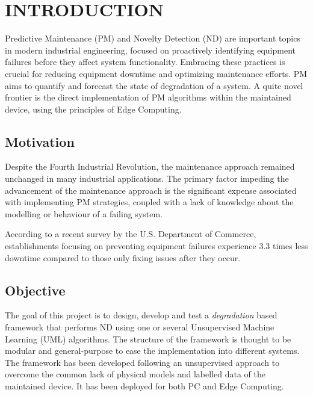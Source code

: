 \section{INTRODUCTION}
\label{sec:introduction}

Predictive Maintenance (PM) and Novelty Detection (ND) are important topics in modern industrial engineering, focused on proactively identifying equipment failures before they affect system functionality. Embracing these practices is crucial for reducing equipment downtime and optimizing maintenance efforts. PM aims to quantify and forecast the state of degradation of a system. A quite novel frontier is the direct implementation of PM algorithms within the maintained device, using the principles of Edge Computing.

\subsection{Motivation}
Despite the Fourth Industrial Revolution, the maintenance approach remained unchanged in many industrial applications. The primary factor impeding the advancement of the maintenance approach is the significant expense associated with implementing PM strategies, coupled with a lack of knowledge about the modelling or behaviour of a failing system.

According to a recent survey by the U.S. Department of Commerce, establishments focusing on preventing equipment failures experience 3.3 times less downtime compared to those only fixing issues after they occur.

\subsection{Objective}
The goal of this project is to design, develop and test a \emph{degradation} based framework
that performs ND using one or several Unsupervised Machine Learning (UML) algorithms. 
The structure of the framework is thought to be modular and general-purpose to ease the implementation into different systems. The framework has been developed following an unsupervised approach to overcome the common lack of physical models and labelled data of the maintained device. It has been deployed for both PC and Edge Computing.